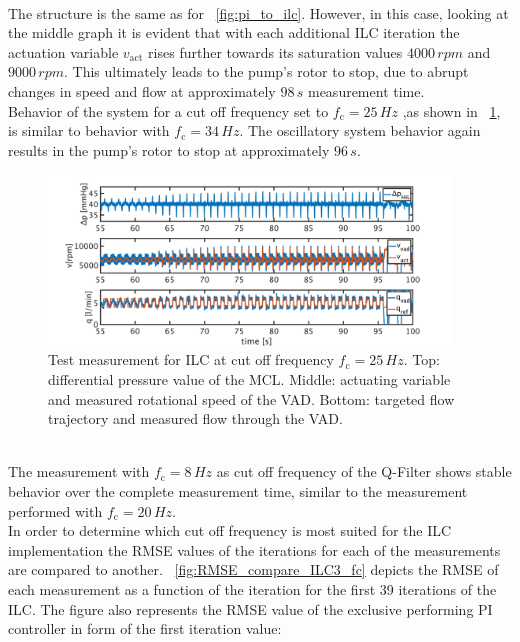 \\The structure is the same as for \figurename~\ref{fig:pi_to_ilc}. However, in this case, looking at the middle graph it is evident that with each additional ILC iteration the actuation variable $v_{\mathrm{act}}$ rises further towards its saturation values $4000\,rpm$ and $9000\,rpm$. This ultimately leads to the pump's rotor to stop, due to abrupt changes in speed and flow at approximately $98\,s$ measurement time.
\\Behavior of the system for a cut off frequency set to $f_{\mathrm{c}}=25\,Hz$ ,as shown in \figurename~\ref{fig:pi_to_ilc_fc_25}, is similar to behavior with $f_{\mathrm{c}}=34\,Hz$. The oscillatory system behavior again results in the pump's rotor to stop at approximately $96\,s$.
\begin{figure}[ht]
  \centering
  \includegraphics[width=0.95\textwidth]{images/chapt_5/ILC/pi_to_ilc_fc_25.pdf}
  \caption[Test measurement for ILC at cut off frequency $f_{\mathrm{c}}=25\,Hz$]{Test measurement for ILC at cut off frequency $f_{\mathrm{c}}=25\,Hz$. Top: differential pressure value of the MCL. Middle: actuating variable and measured rotational speed of the VAD. Bottom: targeted flow trajectory and measured flow through the VAD.}
  \label{fig:pi_to_ilc_fc_25}
\end{figure}
\\The measurement with $f_{\mathrm{c}}=8\,Hz$ as cut off frequency of the Q-Filter shows stable behavior over the complete measurement time, similar to the measurement performed with $f_{\mathrm{c}}=20\,Hz$.
\\In order to determine which cut off frequency is most suited for the ILC implementation the RMSE values of the iterations for each of the measurements are compared to another. \figurename~\ref{fig:RMSE_compare_ILC3_fc} depicts the RMSE of each measurement as a function of the iteration for the first 39 iterations of the ILC. The figure also represents the RMSE value of the exclusive performing PI controller in form of the first iteration value:
